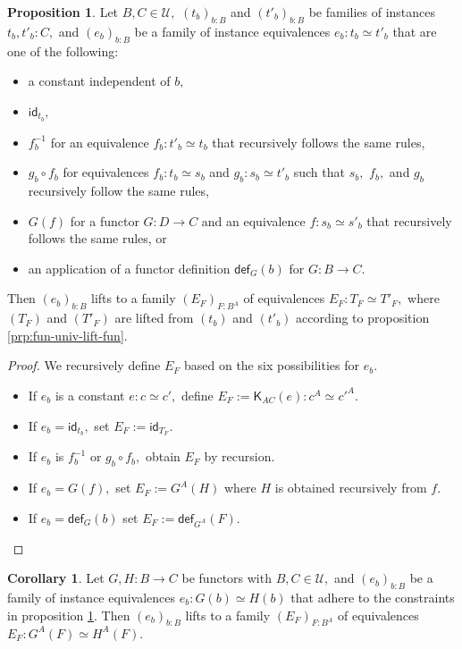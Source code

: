 \documentclass[a4paper]{article}
\theoremstyle{definition}
\newtheorem{proposition}[definition]{Proposition}
\newtheorem{corollary}[definition]{Corollary}
\theoremstyle{remark}
\renewcommand{\equiv}{\simeq}
\newcommand{\U}{\mathcal{U}}
\newcommand{\nm}{\mathsf}
\newcommand{\id}{\nm{id}}
\newcommand{\fndef}[1]{\nm{def}_{#1}}
\newcommand{\combinator}{\nm}
\newcommand{\constFun}{\combinator{K}}
\begin{document}
\begin{proposition}
  \label{prp:fun-univ-lift-equiv}
  Let $B,C \in \U,$ $(t_b)_{b : B}$ and $(t'_b)_{b : B}$ be families of instances
  $t_b,t'_b : C,$ and $(e_b)_{b : B}$ be a family of instance equivalences
  $e_b : t_b \equiv t'_b$ that are one of the following:
  \begin{itemize}
    \item a constant independent of $b,$
    \item $\id_{t_b},$
    \item $f_b^{-1}$ for an equivalence $f_b : t'_b \equiv t_b$ that recursively
    follows the same rules,
    \item $g_b \circ f_b$ for equivalences $f_b : t_b \equiv s_b$ and
    $g_b : s_b \equiv t'_b$ such that $s_b,$ $f_b,$ and $g_b$ recursively
    follow the same rules,
    \item $G(f)$ for a functor $G : D \to C$ and an equivalence
    $f : s_b \equiv s'_b$ that recursively follows the same rules, or
    \item an application of a functor definition $\fndef{G}(b)$ for $G : B \to C.$
  \end{itemize}
  Then $(e_b)_{b : B}$ lifts to a family $(E_F)_{F : B^A}$ of equivalences
  $E_F : T_F \equiv T'_F,$ where $(T_F)$ and $(T'_F)$ are lifted from $(t_b)$
  and $(t'_b)$ according to proposition \ref{prp:fun-univ-lift-fun}.
\end{proposition}

\begin{proof}
  We recursively define $E_F$ based on the six possibilities for $e_b.$
  \begin{itemize}
    \item If $e_b$ is a constant $e : c \equiv c',$ define
    $E_F := \constFun_{AC}(e) : c^A \equiv c'^A.$
    \item If $e_b = \id_{t_b},$ set $E_F := \id_{T_F}.$
    \item If $e_b$ is $f_b^{-1}$ or $g_b \circ f_b,$ obtain $E_F$ by recursion.
    \item If $e_b = G(f),$ set $E_F := G^A(H)$ where $H$ is obtained recursively
    from $f.$
    \item If $e_b = \fndef{G}(b)$ set $E_F := \fndef{G^A}(F).$ \qedhere
  \end{itemize}
\end{proof}

\begin{corollary}
  \label{cor:fun-univ-lift-equiv}
  Let $G,H : B \to C$ be functors with $B,C \in \U,$ and $(e_b)_{b : B}$ be a
  family of instance equivalences $e_b : G(b) \equiv H(b)$ that adhere to the
  constraints in proposition \ref{prp:fun-univ-lift-equiv}. Then $(e_b)_{b : B}$
  lifts to a family $(E_F)_{F : B^A}$ of equivalences $E_F : G^A(F) \equiv H^A(F).$
\end{corollary}
\end{document}
